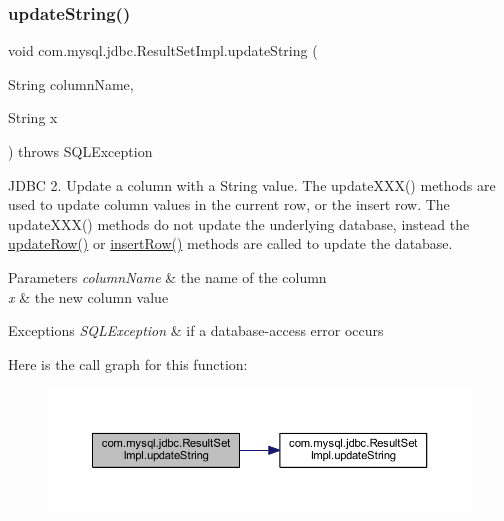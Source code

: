 \subsubsection{\texorpdfstring{update\+String()}{updateString()}\hspace{0.1cm}{\footnotesize\ttfamily [2/2]}}
{\footnotesize\ttfamily void com.\+mysql.\+jdbc.\+Result\+Set\+Impl.\+update\+String (\begin{DoxyParamCaption}\item[{String}]{column\+Name,  }\item[{String}]{x }\end{DoxyParamCaption}) throws S\+Q\+L\+Exception}

J\+D\+BC 2. Update a column with a String value. The update\+X\+X\+X() methods are used to update column values in the current row, or the insert row. The update\+X\+X\+X() methods do not update the underlying database, instead the \mbox{\hyperlink{classcom_1_1mysql_1_1jdbc_1_1_result_set_impl_a2842d32292d023aaeeafedeed3322981}{update\+Row()}} or \mbox{\hyperlink{classcom_1_1mysql_1_1jdbc_1_1_result_set_impl_a78e304e3279cbcf60392f18c1385e3bf}{insert\+Row()}} methods are called to update the database.


\begin{DoxyParams}{Parameters}
{\em column\+Name} & the name of the column \\
\hline
{\em x} & the new column value\\
\hline
\end{DoxyParams}

\begin{DoxyExceptions}{Exceptions}
{\em S\+Q\+L\+Exception} & if a database-\/access error occurs \\
\hline
\end{DoxyExceptions}
Here is the call graph for this function\+:
\nopagebreak
\begin{figure}[H]
\begin{center}
\leavevmode
\includegraphics[width=350pt]{classcom_1_1mysql_1_1jdbc_1_1_result_set_impl_afe4296f714f0851ffe460354b4f4a5c0_cgraph}
\end{center}
\end{figure}
\mbox{\label{classcom_1_1mysql_1_1jdbc_1_1_result_set_impl_adcae140a9e3948cda8cdbd564ba88ed7}} 
